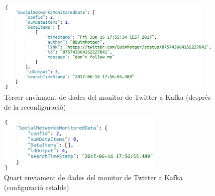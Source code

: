 \begin{figure}
\centering
\includegraphics[width=11cm]{Figures/tfg3}
\decoRule
\caption{Tercer enviament de dades del monitor de Twitter a Kafka (després de la reconfiguració)}
\label{fig:tfg3}
\end{figure} 

\begin{figure}
\centering
\includegraphics[width=8cm]{Figures/tfg4}
\decoRule
\caption{Quart enviament de dades del monitor de Twitter a Kafka (configuració estable)}
\label{fig:tfg4}
\end{figure} 